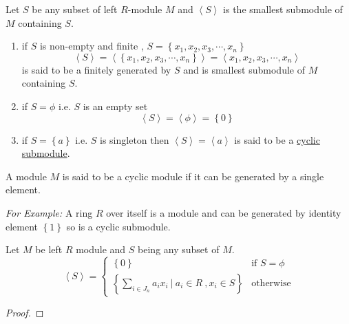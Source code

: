 \begin{remark}\qquad
	\begin{description}
	\item Let $S$ be any subset of left $R$-module $M$ and $\left\langle S \right\rangle $ is the smallest submodule of $M$ containing $S$.\newline
	\begin{enumerate}
		\item if $S$ is non-empty and finite , $S = \left\lbrace x_1,x_2,x_3, \cdots , x_n \right\rbrace $ \[ \left\langle S \right\rangle = \left\langle \left\lbrace x_1,x_2,x_3, \cdots , x_n \right\rbrace \right\rangle  = \left\langle x_1,x_2,x_3, \cdots , x_n \right\rangle \] is said to be a finitely generated by $S$ and is smallest submodule of $M$ containing $S$.
		\item if $S = \phi$ \quad i.e. $S$ is an empty set \[ \left\langle S \right\rangle = \left\langle \phi \right\rangle = \left\lbrace 0 \right\rbrace \] 
		\item if $S = \left\lbrace a\right\rbrace $ \quad i.e. $S $ is singleton then $\left\langle S \right\rangle = \left\langle a\right\rangle $ is said to be a \underline{cyclic submodule}.
	\end{enumerate}
\end{description}
\end{remark}
\bigskip
\begin{definition}
	A module $M$ is said to be a cyclic module if it can be generated by a single element.
\end{definition}
\textit{For Example:}
	A ring $R$ over itself is a module and can be generated by identity element $ \left\lbrace 1\right\rbrace $ so is a cyclic submodule.
\bigskip
\begin{thm}
	Let $M$ be left $R$ module and $S$ being any subset of $M$.
	\begin{equation*} \left\langle S\right\rangle = \begin{cases}
	\left\lbrace 0\right\rbrace & \text{if $S = \phi$} \\ \left\lbrace \sum\limits_{i \in J_n} a_i x_i \ \vert \  a_i \in R \ , x_i \in S\right\rbrace  & \text{otherwise}
	\end{cases}
	\end{equation*}
\end{thm}
\begin{proof}
	
\end{proof}